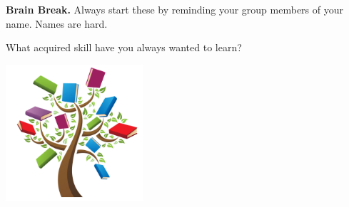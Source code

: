 \documentclass[handout]{beamer}
\newcommand{\fn}{\insertframenumber}
\theoremstyle{definition}
\begin{document}
\begin{frame}{\fn}
	\begin{block}{\textbf{Brain Break.}}
		Always start these by reminding your group members of your name.  Names are hard.
		
		What acquired skill have you always wanted to learn?
		\begin{center}
			\includegraphics[width=2in]{../images/skill_tree}
		\end{center}
	\end{block}
\end{frame}
\end{document}
